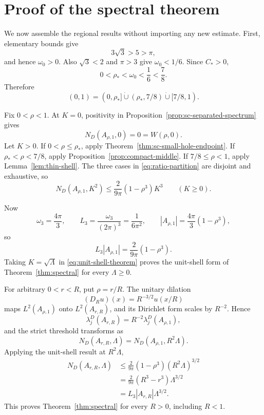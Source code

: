 \documentclass[11pt]{article}
\numberwithin{equation}{section}
\theoremstyle{definition}
\theoremstyle{remark}
\begin{document}
\section{Proof of the spectral theorem}

We now assemble the regional results without importing any new estimate.
First, elementary bounds give
\[
  3\sqrt3>5>\pi,
\]
and hence \(\omega_0>0\).  Also \(\sqrt3<2\) and \(\pi>3\) give
\(\omega_0<1/6\).  Since \(C_*>0\),
\begin{equation}
  0<\rho_*<\omega_0<\frac16<\frac78.
  \label{eq:ratio-ordering}
\end{equation}
Therefore
\begin{equation}
  (0,1)
  =(0,\rho_*]\mathbin{\dot\cup}
  (\rho_*,7/8)\mathbin{\dot\cup}
  [7/8,1).
  \label{eq:ratio-partition}
\end{equation}

Fix \(0<\rho<1\).  At \(K=0\), positivity in
Proposition~\ref{prop:sc-separated-spectrum} gives
\begin{equation}
  N_D(A_{\rho,1},0)=0=W(\rho,0).
  \label{eq:k-zero}
\end{equation}
Let \(K>0\).  If \(0<\rho\le\rho_*\), apply
Theorem~\ref{thm:sc-small-hole-endpoint}.  If \(\rho_*<\rho<7/8\), apply
Proposition~\ref{prop:compact-middle}.  If \(7/8\le\rho<1\), apply
Lemma~\ref{lem:thin-shell}.  The three cases in
\eqref{eq:ratio-partition} are disjoint and exhaustive, so
\begin{equation}
  N_D(A_{\rho,1},K^2)
  \le\frac{2}{9\pi}(1-\rho^3)K^3
  \qquad(K\ge0).
  \label{eq:unit-shell-theorem}
\end{equation}

Now
\[
  \omega_3=\frac{4\pi}{3},
  \qquad
  L_3=\frac{\omega_3}{(2\pi)^3}=\frac1{6\pi^2},
  \qquad
  |A_{\rho,1}|=\frac{4\pi}{3}(1-\rho^3),
\]
so
\begin{equation}
  L_3|A_{\rho,1}|=\frac{2}{9\pi}(1-\rho^3).
  \label{eq:weyl-normalization}
\end{equation}
Taking \(K=\sqrt\Lambda\) in \eqref{eq:unit-shell-theorem} proves the
unit-shell form of Theorem~\ref{thm:spectral} for every \(\Lambda\ge0\).

For arbitrary \(0<r<R\), put \(\rho=r/R\).  The unitary dilation
\[
  (D_Ru)(x)=R^{-3/2}u(x/R)
\]
maps \(L^2(A_{\rho,1})\) onto \(L^2(A_{r,R})\), and its Dirichlet form
scales by \(R^{-2}\).  Hence
\[
  \lambda_j^D(A_{r,R})=R^{-2}\lambda_j^D(A_{\rho,1}),
\]
and the strict threshold transforms as
\begin{equation}
  N_D(A_{r,R},\Lambda)
  =N_D(A_{\rho,1},R^2\Lambda).
  \label{eq:dilation-count}
\end{equation}
Applying the unit-shell result at \(R^2\Lambda\),
\[
\begin{aligned}
  N_D(A_{r,R},\Lambda)
  &\le\frac{2}{9\pi}(1-\rho^3)(R^2\Lambda)^{3/2}\\
  &=\frac{2}{9\pi}(R^3-r^3)\Lambda^{3/2}\\
  &=L_3|A_{r,R}|\Lambda^{3/2}.
\end{aligned}
\]
This proves Theorem~\ref{thm:spectral} for every \(R>0\), including
\(R<1\).
\end{document}
